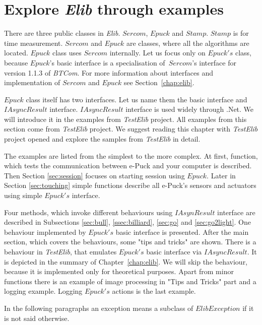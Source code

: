 \section{Explore {\it Elib} through examples} \label{sec:interfaces}
  There are three public classes in {\it Elib}. $Sercom$, $Epuck$ and $Stamp$.
  $Stamp$ is for time measurement. $Sercom$ and $Epuck$ are classes, where all the algorithms are located.
  $Epuck$ class uses $Sercom$ internally.
  Let us focus only on $Epuck's$ class, because $Epuck$'s basic interface is a specialisation of~$Sercom$'s
  interface for version 1.1.3 of {\it BTCom}.
  For more information about interfaces and implementation of $Sercom$ and $Epuck$ see Section~\ref{chap:elib}.

  $Epuck$ class itself has two interfaces. Let us name them the basic interface and $IAsyncResult$ interface.
  $IAsyncResult$ interface is used widely through .Net. We will introduce it in the examples from {\it TestElib} project.
  All examples from this section come from {\it TestElib} project. We suggest reading this chapter with {\it TestElib} project opened
  and explore the samples from {\it TestElib} in detail.


  The examples are listed from the simplest to the more complex. 
  At first, function, which tests the communication between e-Puck and your computer is described.
  Then Section \ref{sec:session} focuses on starting session using $Epuck$.
  Later in Section \ref{sec:touching} simple functions describe all e-Puck's sensors and actuators using simple $Epuck's$ interface.
  
  Four methods, which invoke different behaviours using $IAsynResult$ 
  interface are described in Subsections
  \ref{sec:bull}, \ref{ssec:billiard}, \ref{sec:go} and \ref{sec:go2light}.
  One behaviour implemented by $Epuck's$ basic interface is presented.
  After the main section, which covers the behaviours, some "tips and tricks" are shown.
  There is a behaviour in {\it TestElib}, that emulates $Epuck's$ basic interface via $IAsyncResult$. 
  It is depicted in the summary of Chapter~\ref{chap:elib}.
  We will skip the behaviour, because it is implemented only for theoretical purposes.
  Apart from minor functions there is an example of image processing in "Tips and Tricks" part and a logging example.
  Logging $Epuck's$ actions is the last example.
  \begin{remark}
  In the following paragraphs an exception means a subclass of $ElibException$ if it is not said otherwise.
  \end{remark}
    

